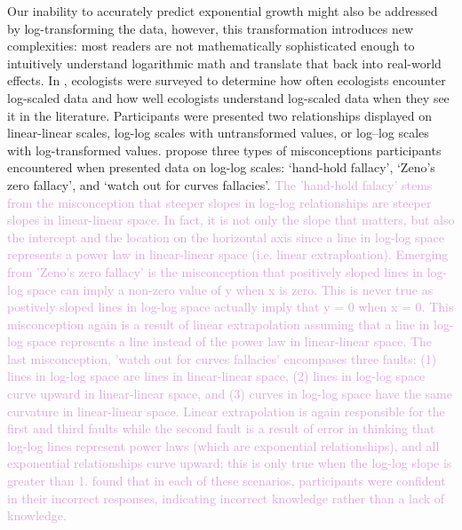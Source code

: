 \documentclass[]{interact}
\theoremstyle{plain}%
\theoremstyle{definition}
\theoremstyle{remark}
\begin{document}
Our inability to accurately predict exponential growth might also be
addressed by log-transforming the data, however, this transformation
introduces new complexities: most readers are not mathematically
sophisticated enough to intuitively understand logarithmic math and
translate that back into real-world effects. In
\citet{menge_logarithmic_2018}, ecologists were surveyed to determine
how often ecologists encounter log-scaled data and how well ecologists
understand log-scaled data when they see it in the literature.
Participants were presented two relationships displayed on linear-linear
scales, log-log scales with untransformed values, or log--log scales
with log-transformed values. \citet{menge_logarithmic_2018} propose
three types of misconceptions participants encountered when presented
data on log-log scales: `hand-hold fallacy', `Zeno's zero fallacy', and
`watch out for curves fallacies'. \textcolor{Plum}{
The 'hand-hold falacy' stems from the misconception that steeper slopes in log-log relationships are steeper slopes in linear-linear space. 
In fact, it is not only the slope that matters, but also the intercept and the location on the horizontal axis since a line in log-log space represents a power law in linear-linear space (i.e. linear extraploation). 
Emerging from 'Zeno's zero fallacy' is the misconception that positively sloped lines in log-log space can imply a non-zero value of y when x is zero. This is never true as postively sloped lines in log-log space actually imply that y = 0 when x = 0. 
This misconception again is a result of linear extrapolation assuming that a line in log-log space represents a line instead of the power law in linear-linear space. 
The last misconception, 'watch out for curves fallacies' encompases three faults: (1) lines in log-log space are lines in linear-linear space, (2) lines in log-log space curve upward in linear-linear space, and (3) curves in log-log space have the same curvature in linear-linear space. 
Linear extrapolation is again responsible for the first and third faults while the second fault is a result of error in thinking that log-log lines represent power laws (which are exponential relationships), and all exponential relationships curve upward; this is only true when the log-log slope is greater than 1.}
\textcolor{Plum}{
\citet{menge_logarithmic_2018} found that in each of these scenarios, participants were confident in their incorrect responses, indicating incorrect knowledge rather than a lack of knowledge.
}
\end{document}
